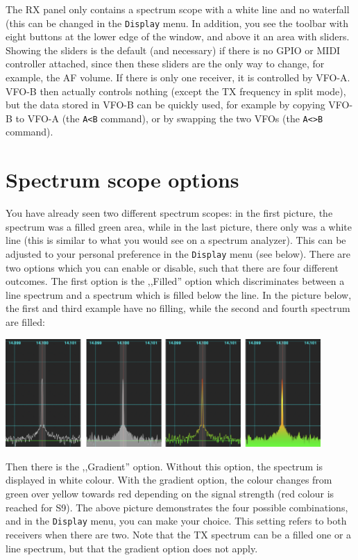 \documentclass[12pt]{book}
\begin{document}
 The RX panel only contains a
 spectrum scope with a white line and no waterfall (this can be changed in the
 \texttt{Display} menu. In addition, you see the toolbar
 with eight buttons at the lower edge of the window, and above
 it an area with sliders. Showing the sliders is the default
 (and necessary) if there is no GPIO or MIDI controller attached,
 since then these sliders are the only way to change, for example,
 the AF volume. If there is only one receiver, it is controlled
 by VFO-A. VFO-B then actually controls nothing (except the TX
 frequency in split mode), but the data stored in VFO-B can
 be quickly used, for example by copying VFO-B to VFO-A (the
 \texttt{A<B} command), or by swapping the two VFOs (the
 \texttt{A<>B} command).
  
\section{Spectrum scope options}

You have already seen two different spectrum scopes: in the first
picture, the  spectrum was a filled green area, while in the last
picture, there only was a white line (this is similar to what you
would see on a spectrum analyzer). This can be adjusted to your
personal preference in the \texttt{Display} menu (see below). There
are two options which you can enable or disable, such that there
are four different outcomes. The first option is the ,,Filled'' option
which discriminates between a line spectrum and a spectrum which is
filled below the line. In the picture below, the first and third
example have no filling, while the second and fourth spectrum
are filled:
\begin{center}
\includegraphics[width=12cm]{ScopeFilling.png}
\end{center}
Then there is the ,,Gradient'' option. Without this option, the
spectrum is displayed in white colour. With the gradient option,
the colour changes from green over yellow towards red depending
on the signal strength (red colour is reached for S9). The above
picture demonstrates the four possible combinations, and in
the \texttt{Display} menu, you can make your choice. This setting
refers to both receivers when there are two. Note that the TX
spectrum can be a filled one or a line spectrum, but that the
gradient option does not apply.
\end{document}
